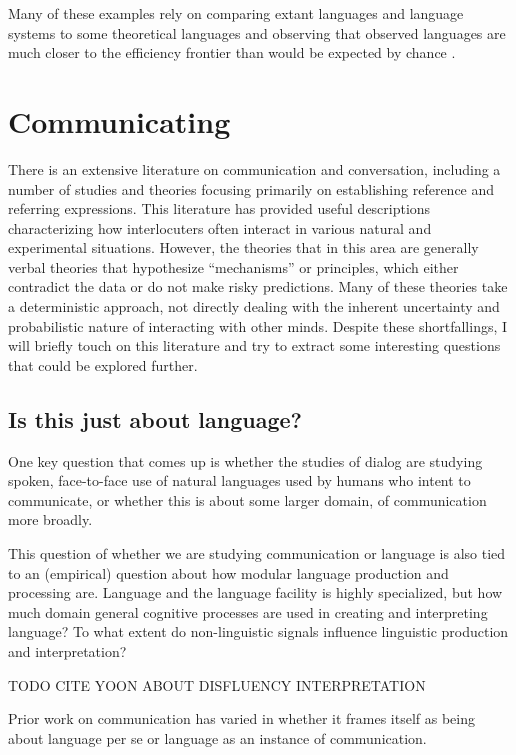 \documentclass[]{article}
\begin{document}
Many of these examples rely on comparing extant languages and language systems to some theoretical languages and observing that observed languages are much closer to the efficiency frontier than would be expected by chance \cite{futrell2022}. 


\section{Communicating}

There is an extensive literature on communication and conversation, including a number of studies and theories focusing primarily on establishing reference and referring expressions. This literature has provided useful descriptions characterizing how interlocuters often interact in various natural and experimental situations. However, the theories that in this area are generally verbal theories that hypothesize ``mechanisms'' or principles, which either contradict the data or do not make risky predictions. Many of these theories take a deterministic approach, not directly dealing with the inherent uncertainty and probabilistic nature of interacting with other minds. Despite these shortfallings, I will briefly touch on this literature and try to extract some interesting questions that could be explored further. 


\subsection{Is this just about language?}


One key question that comes up is whether the studies of dialog are studying spoken, face-to-face use of natural languages used by humans who intent to communicate, or whether this is about some larger domain, of communication more broadly. 

This question of whether we are studying communication or language is also tied to an (empirical) question about how modular language production and processing are. Language and the language facility is highly specialized, but how much domain general cognitive processes are used in creating and interpreting language? To what extent do non-linguistic signals influence linguistic production and interpretation? 

TODO CITE YOON ABOUT DISFLUENCY INTERPRETATION

Prior work on communication has varied in whether it frames itself as being about language per se or language as an instance of communication. 
\end{document}
